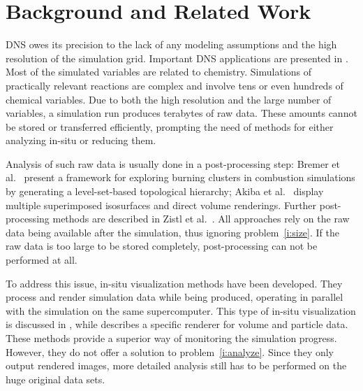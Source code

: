 
\section{Background and Related Work} 
\label{sec:related} 
% 
\ac{DNS} owes its precision to the lack of any modeling assumptions and the high
resolution of the simulation grid. Important \ac{DNS} applications are presented in
\cite{Hilbert2004}. Most of the simulated variables are related to chemistry.
Simulations of practically relevant reactions are complex and involve tens or
even hundreds of chemical variables. Due to both the high resolution and the
large number of variables, a simulation run produces terabytes of raw data.
These amounts cannot be stored or transferred efficiently, prompting the need of
methods for either analyzing in-situ or reducing them.

Analysis of such raw data is usually done in a post-processing step: Bremer et
al.~\cite{Bremer2009} present a framework for exploring burning clusters in
combustion simulations by generating a level-set-based topological hierarchy;
Akiba et al.~\cite{Akiba2007} display multiple superimposed isosurfaces and
direct volume renderings. Further post-processing methods are described in Zistl
et al.~\cite{Zistl2009}. All approaches rely on the raw data being available
after the simulation, thus ignoring problem~\ref{i:size}. If the raw data is too
large to be stored completely, post-processing can not be performed at all.


To address this issue, in-situ visualization methods have been developed.
They process and render simulation data while being produced, operating in
parallel with the simulation on the same supercomputer. 
%
%
This type of in-situ visualization is discussed in \cite{Ma2009}, while
\cite{Yu2010} describes a specific renderer for volume and particle data. These
methods provide a superior way of monitoring the simulation progress. However,
they do not offer a solution to problem~\ref{i:analyze}. Since they only output
rendered images, more detailed analysis still has to be performed on the huge
original data sets.

